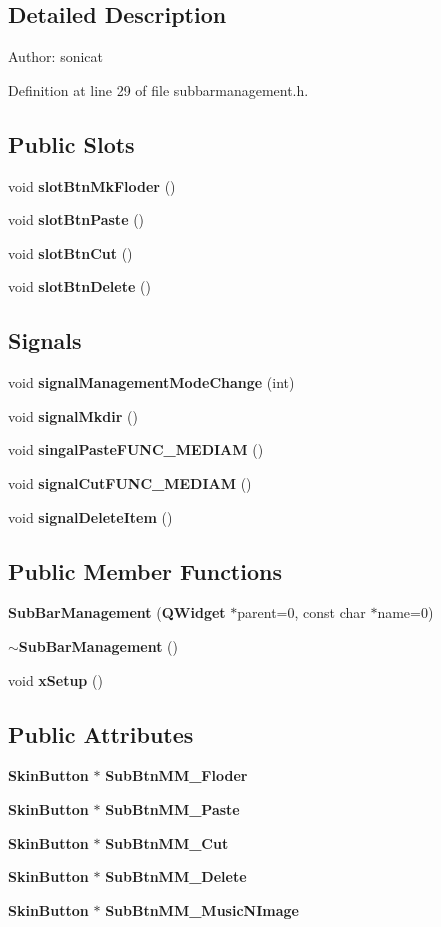 \subsection{Detailed Description}
\begin{Desc}
\item[Author:]sonicat \end{Desc}




Definition at line 29 of file subbarmanagement.h.\subsection*{Public Slots}
\begin{CompactItemize}
\item 
void {\bf slot\-Btn\-Mk\-Floder} ()
\item 
void {\bf slot\-Btn\-Paste} ()
\item 
void {\bf slot\-Btn\-Cut} ()
\item 
void {\bf slot\-Btn\-Delete} ()
\end{CompactItemize}
\subsection*{Signals}
\begin{CompactItemize}
\item 
void {\bf signal\-Management\-Mode\-Change} (int)
\item 
void {\bf signal\-Mkdir} ()
\item 
void {\bf singal\-Paste\-FUNC\_\-MEDIAM} ()
\item 
void {\bf signal\-Cut\-FUNC\_\-MEDIAM} ()
\item 
void {\bf signal\-Delete\-Item} ()
\end{CompactItemize}
\subsection*{Public Member Functions}
\begin{CompactItemize}
\item 
{\bf Sub\-Bar\-Management} ({\bf QWidget} $\ast$parent=0, const char $\ast$name=0)
\item 
{\bf $\sim$Sub\-Bar\-Management} ()
\item 
void {\bf x\-Setup} ()
\end{CompactItemize}
\subsection*{Public Attributes}
\begin{CompactItemize}
\item 
{\bf Skin\-Button} $\ast$ {\bf Sub\-Btn\-MM\_\-Floder}
\item 
{\bf Skin\-Button} $\ast$ {\bf Sub\-Btn\-MM\_\-Paste}
\item 
{\bf Skin\-Button} $\ast$ {\bf Sub\-Btn\-MM\_\-Cut}
\item 
{\bf Skin\-Button} $\ast$ {\bf Sub\-Btn\-MM\_\-Delete}
\item 
{\bf Skin\-Button} $\ast$ {\bf Sub\-Btn\-MM\_\-Music\-NImage}
\end{CompactItemize}
